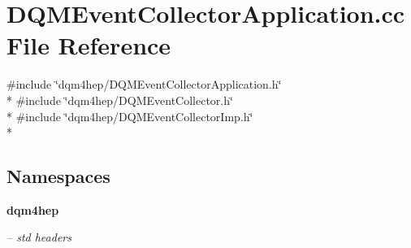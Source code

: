 \section{D\+Q\+M\+Event\+Collector\+Application.\+cc File Reference}
\label{DQMEventCollectorApplication_8cc}
{\ttfamily \#include \char`\"{}dqm4hep/\+D\+Q\+M\+Event\+Collector\+Application.\+h\char`\"{}}\\*
{\ttfamily \#include \char`\"{}dqm4hep/\+D\+Q\+M\+Event\+Collector.\+h\char`\"{}}\\*
{\ttfamily \#include \char`\"{}dqm4hep/\+D\+Q\+M\+Event\+Collector\+Imp.\+h\char`\"{}}\\*
\subsection*{Namespaces}
\begin{DoxyCompactItemize}
\item 
 {\bf dqm4hep}
\begin{DoxyCompactList}\small\item\em -- std headers \end{DoxyCompactList}\end{DoxyCompactItemize}
